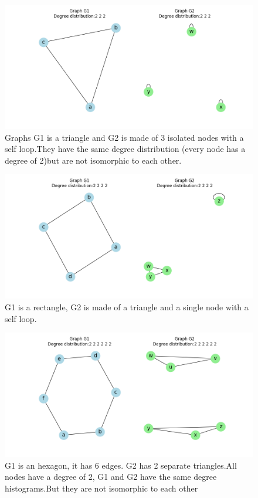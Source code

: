 \documentclass[a4paper]{article}
\begin{document}
\begin{figure}[ht]
    \centering
    \includegraphics[width=.6\textwidth]{figures/graph_triangle_vs_three_single_loops.png}
    \caption{Graphs G1 is a triangle and G2 is made of 3 isolated nodes with a self loop.They have the same degree distribution (every node has a degree of 2)but are not isomorphic to each other.}
    \label{fig:graph_triangle_vs_three_single_loops}
\end{figure}



\begin{figure}[ht]
    \centering
    \includegraphics[width=.6\textwidth]{figures/graph_rect_vs_triangle_plus_single_loop.png}
    \caption{G1 is a rectangle, G2 is made of a triangle and a single node with a self loop.}
    \label{fig:graph_rect_vs_triangle_plus_single_loop}
\end{figure}



\begin{figure}[ht]
    \centering
    \includegraphics[width=.6\textwidth]{figures/graph_compare_triangle_hexagon.png}
    \caption{G1 is an hexagon, it has 6 edges. G2 has 2 separate triangles.All nodes have a degree of 2, G1 and G2 have the same degree histograms.But they are not isomorphic to each other}
    \label{fig:graph_compare_triangle_hexagon}
\end{figure}
\end{document}
